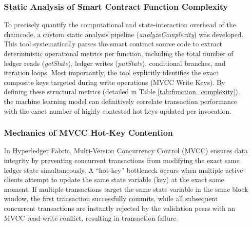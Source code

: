 \documentclass[manuscript,screen,nofonts]{acmart}
\begin{document}
\subsubsection{Static Analysis of Smart Contract Function Complexity}

To precisely quantify the computational and state-interaction overhead of the chaincode, a custom static analysis pipeline (\textit{analyzeComplexity}) was developed. This tool systematically parses the smart contract source code to extract deterministic operational metrics per function, including the total number of ledger reads (\textit{getState}), ledger writes (\textit{putState}), conditional branches, and iteration loops. Most importantly, the tool explicitly identifies the exact composite keys targeted during write operations (MVCC Write Keys). By defining these structural metrics (detailed in Table \ref{tab:function_complexity}), the machine learning model can definitively correlate transaction performance with the exact number of highly contested hot-keys updated per invocation.

\begin{table}[ht]
\centering
\caption{Static Analysis of Smart Contract Function Complexity and MVCC Hot-Keys}
\label{tab:function_complexity}
\end{table}
 
  \subsubsection{Mechanics of MVCC Hot-Key Contention}
  In Hyperledger Fabric, Multi-Version Concurrency Control (MVCC) ensures data integrity by preventing concurrent transactions from modifying the exact same ledger state simultaneously. A ``hot-key'' bottleneck occurs when multiple active clients attempt to update the same state variable (key) at the exact same moment. If multiple transactions target the same state variable in the same block window, the first transaction successfully commits, while all subsequent concurrent transactions are instantly rejected by the validation peers with an MVCC read-write conflict, resulting in transaction failure.
  
\end{document}
